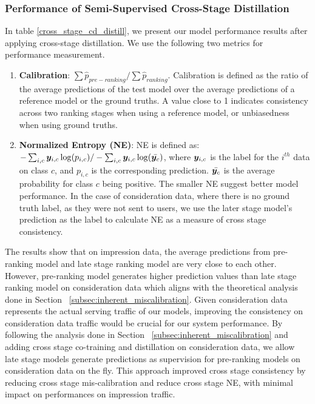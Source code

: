 \subsubsection{Performance of Semi-Supervised Cross-Stage Distillation}
In table \ref{cross_stage_cd_distill}, we present our model performance results after applying cross-stage distillation. We use the following two metrics for performance measurement. 
\newline
\begin{enumerate}
    \item \textbf{Calibration}: $\sum{\hat{p}_{pre-ranking}}/\sum{\hat{p}_{ranking}}$. Calibration is defined as the ratio of the average predictions of the test model over the average predictions of a reference model or the ground truths. A value close to 1 indicates consistency across two ranking stages when using a reference model, or unbiasedness when using ground truths.
    \item \textbf{Normalized Entropy (NE)}: NE is defined as:\\ $-\sum_{i,c}{{\bm{y}}_{i,c}\log({p_{i,c}})}/-\sum_{i,c}{{\bm{y}}_{i,c}\log({\bar{{\bm{y}}_c}})}$, where ${\bm{y}}_{i,c}$ is the label for the $i^{th}$ data on class $c$, and $p_{i,c}$ is the corresponding prediction. $\bar{{\bm{y}}_c}$ is the average probability for class $c$ being positive. The smaller NE suggest better model performance. In the case of consideration data, where there is no ground truth label, as they were not sent to users, we use the later stage model's prediction as the label to calculate NE as a measure of cross stage consistency. 
\end{enumerate}

\vspace{6pt}

The results show that on impression data, the average predictions from pre-ranking model and late stage ranking model are very close to each other. However, pre-ranking model generates higher prediction values than late stage ranking model on consideration data which aligns with the theoretical analysis done in Section ~\ref{subsec:inherent_miscalibration}. Given consideration data represents the actual serving traffic of our models, improving the consistency on consideration data traffic would be crucial for our system performance. By following the analysis done in Section ~\ref{subsec:inherent_miscalibration} and adding cross stage co-training and distillation on consideration data, we allow late stage models generate predictions as supervision for pre-ranking models on consideration data on the fly. This approach improved cross stage consistency by reducing cross stage mis-calibration and reduce cross stage NE, with minimal impact on performances on impression traffic. 


